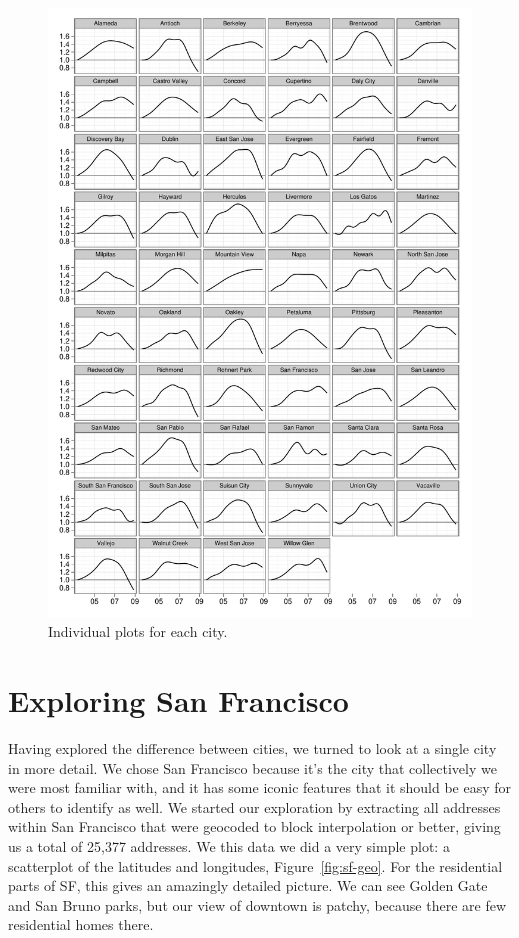\documentclass[oneside]{article}
\begin{document}
\begin{figure}[htbp]
  \centering
  \includegraphics[width=0.9\linewidth]{cities-individual}
  \caption{Individual plots for each city.}
  \label{fig:individual}
\end{figure}

\section{Exploring San Francisco}

Having explored the difference between cities, we turned to look at a single city in more detail.  We chose San Francisco because it's the city that collectively we were most familiar with, and it has some iconic features that it should be easy for others to identify as well.  We started our exploration by extracting all addresses within San Francisco that were geocoded to block interpolation or better, giving us a total of 25,377 addresses.  We this data we did a very simple plot: a scatterplot of the latitudes and longitudes, Figure~\ref{fig:sf-geo}.  For the residential parts of SF, this gives an amazingly detailed picture.  We can see Golden Gate and San Bruno parks, but our view of downtown is patchy, because there are few residential homes there.
\end{document}
